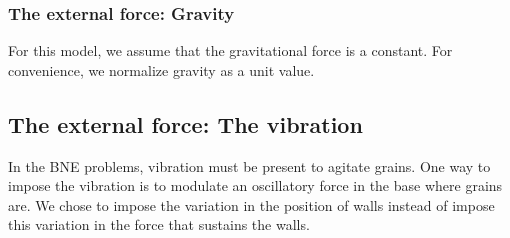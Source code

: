 \subsubsection{The external force: Gravity}
\label{subsubchap:Gravidade}
    For this model, we assume that the gravitational force is a constant. For convenience, we normalize gravity as a unit value.

\subsection{The external force: The vibration}
    In the BNE problems, vibration must be present to agitate grains. One way to impose the vibration is to modulate an oscillatory force in the base where grains are. We chose to impose the variation in the position of walls instead of impose this variation in the force that sustains the walls.

